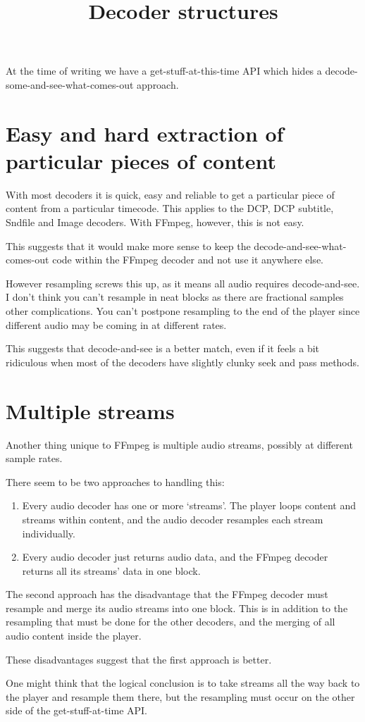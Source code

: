 \documentclass{article}
\title{Decoder structures}
\author{}
\date{}
\begin{document}
\maketitle

At the time of writing we have a get-stuff-at-this-time API which
hides a decode-some-and-see-what-comes-out approach.

\section{Easy and hard extraction of particular pieces of content}

With most decoders it is quick, easy and reliable to get a particular
piece of content from a particular timecode.  This applies to the DCP,
DCP subtitle, Sndfile and Image decoders.  With FFmpeg, however, this is not easy.

This suggests that it would make more sense to keep the
decode-and-see-what-comes-out code within the FFmpeg decoder and not
use it anywhere else.

However resampling screws this up, as it means all audio requires
decode-and-see.  I don't think you can't resample in neat blocks as
there are fractional samples other complications.  You can't postpone
resampling to the end of the player since different audio may be
coming in at different rates.

This suggests that decode-and-see is a better match, even if it feels
a bit ridiculous when most of the decoders have slightly clunky seek
and pass methods.


\section{Multiple streams}

Another thing unique to FFmpeg is multiple audio streams, possibly at
different sample rates.

There seem to be two approaches to handling this:

\begin{enumerate}
\item Every audio decoder has one or more `streams'.  The player loops
  content and streams within content, and the audio decoder resamples
  each stream individually.
\item Every audio decoder just returns audio data, and the FFmpeg
  decoder returns all its streams' data in one block.
\end{enumerate}

The second approach has the disadvantage that the FFmpeg decoder must
resample and merge its audio streams into one block.  This is in
addition to the resampling that must be done for the other decoders,
and the merging of all audio content inside the player.

These disadvantages suggest that the first approach is better.

One might think that the logical conclusion is to take streams all the
way back to the player and resample them there, but the resampling
must occur on the other side of the get-stuff-at-time API.
\end{document}
